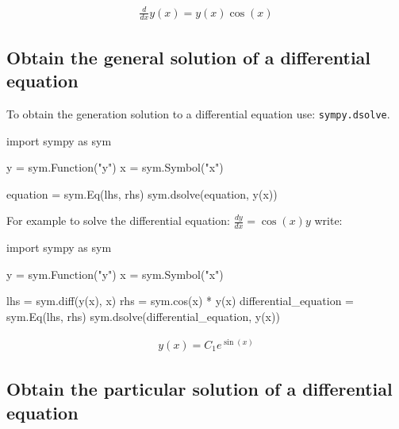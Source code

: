 \begin{equation*}
\begin{split}\displaystyle \frac{d}{d x} y{\left(x \right)} = y{\left(x \right)} \cos{\left(x \right)}\end{split}
\end{equation*}




\subsection{Obtain the general solution of a differential equation}
\label{\detokenize{tools-for-mathematics/09-differential-equations/how/main:how-to-obtain-the-general-solution-of-a-differential-equation}}

To obtain the generation solution to a differential equation use:
\texttt{sympy.dsolve}.


\begin{pyin}
import sympy as sym

y = sym.Function("y")
x = sym.Symbol("x")

equation = sym.Eq(lhs, rhs)
sym.dsolve(equation, y(x))
\end{pyin}



For example to solve the differential equation: \(\frac{dy}{dx} = \cos(x) y\) 
write:


\begin{pyin}
import sympy as sym

y = sym.Function("y")
x = sym.Symbol("x")

lhs = sym.diff(y(x), x)
rhs = sym.cos(x) * y(x)
differential_equation = sym.Eq(lhs, rhs)
sym.dsolve(differential_equation, y(x))
\end{pyin}




\begin{equation*}
\begin{split}\displaystyle y{\left(x \right)} = C_{1} e^{\sin{\left(x \right)}}\end{split}
\end{equation*}




\subsection{Obtain the particular solution of a differential equation}
\label{\detokenize{tools-for-mathematics/09-differential-equations/how/main:how-to-obtain-the-particular-solution-of-a-differential-equation}}

